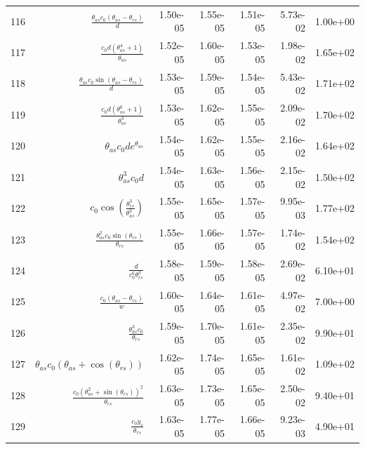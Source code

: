 \begin{tabularx}{\textwidth}{lRRRRRl}
116  &  $ \displaystyle\frac{\theta_{as} c_{0} \left(\theta_{as} - \theta_{rs}\right)}{d} $  &  1.50e-05  &  1.55e-05  &  1.51e-05  &  5.73e-02  &  1.00e+00  \\ 
117  &  $ \displaystyle\frac{c_{0} d \left(\theta_{as}^{4} + 1\right)}{\theta_{as}} $  &  1.52e-05  &  1.60e-05  &  1.53e-05  &  1.98e-02  &  1.65e+02  \\ 
118  &  $ \displaystyle\frac{\theta_{as} c_{0} \sin{\left(\theta_{as} - \theta_{rs} \right)}}{d} $  &  1.53e-05  &  1.59e-05  &  1.54e-05  &  5.43e-02  &  1.71e+02  \\ 
119  &  $ \displaystyle\frac{c_{0} d \left(\theta_{as}^{6} + 1\right)}{\theta_{as}^{3}} $  &  1.53e-05  &  1.62e-05  &  1.55e-05  &  2.09e-02  &  1.70e+02  \\ 
120  &  $ \theta_{as} c_{0} d e^{\theta_{as}} $  &  1.54e-05  &  1.62e-05  &  1.55e-05  &  2.16e-02  &  1.64e+02  \\ 
121  &  $ \theta_{as}^{3} c_{0} d $  &  1.54e-05  &  1.63e-05  &  1.56e-05  &  2.15e-02  &  1.50e+02  \\ 
122  &  $ c_{0} \cos{\left(\displaystyle\frac{\theta_{rs}^{3}}{\theta_{as}^{3}} \right)} $  &  1.55e-05  &  1.65e-05  &  1.57e-05  &  9.95e-03  &  1.77e+02  \\ 
123  &  $ \displaystyle\frac{\theta_{as}^{2} c_{0} \sin{\left(\theta_{rs} \right)}}{\theta_{rs}} $  &  1.55e-05  &  1.66e-05  &  1.57e-05  &  1.74e-02  &  1.54e+02  \\ 
124  &  $ \displaystyle\frac{d}{c_{0}^{6} \theta_{rs}^{3}} $  &  1.58e-05  &  1.59e-05  &  1.58e-05  &  2.69e-02  &  6.10e+01  \\ 
125  &  $ \displaystyle\frac{c_{0} \left(\theta_{as} - \theta_{rs}\right)}{w} $  &  1.60e-05  &  1.64e-05  &  1.61e-05  &  4.97e-02  &  7.00e+00  \\ 
126  &  $ \displaystyle\frac{\theta_{as}^{3} c_{0}}{\theta_{rs}} $  &  1.59e-05  &  1.70e-05  &  1.61e-05  &  2.35e-02  &  9.90e+01  \\ 
127  &  $ \theta_{as} c_{0} \left(\theta_{as} + \cos{\left(\theta_{rs} \right)}\right) $  &  1.62e-05  &  1.74e-05  &  1.65e-05  &  1.61e-02  &  1.09e+02  \\ 
128  &  $ \displaystyle\frac{c_{0} \left(\theta_{as}^{2} + \sin{\left(\theta_{rs} \right)}\right)^{2}}{\theta_{rs}} $  &  1.63e-05  &  1.73e-05  &  1.65e-05  &  2.50e-02  &  9.40e+01  \\ 
129  &  $ \displaystyle\frac{c_{0} y_c}{\theta_{rs}} $  &  1.63e-05  &  1.77e-05  &  1.66e-05  &  9.23e-03  &  4.90e+01  \\ 

\end{tabularx}
